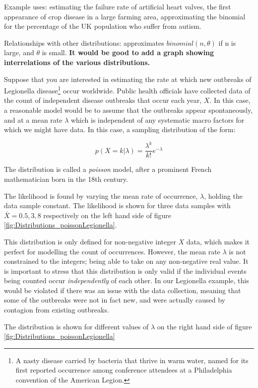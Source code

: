 \documentclass[11pt,fullpage]{book}
\begin{document}
Example uses: estimating the failure rate of artificial heart valves, the first appearance of crop disease in a large farming area, approximating the binomial for the percentage of the UK population who suffer from autism.

Relationships with other distributions: approximates $binomial(n,\theta)$ if n is large, and $\theta$ is small. \textbf{It would be good to add a graph showing interrelations of the various distributions.}

Suppose that you are interested in estimating the rate at which new outbreaks of Legionella disease\footnote{A nasty disease carried by bacteria that thrive in warm water, named for its first reported occurrence among conference attendees at a Philadelphia convention of the American Legion.} occur worldwide. Public health officials have collected data of the count of independent disease outbreaks that occur each year, $X$. In this case, a reasonable model would be to assume that the outbreaks appear spontaneously, and at a mean rate $\lambda$ which is independent of any systematic macro factors for which we might have data. In this case, a sampling distribution of the form:

\begin{equation}
p(X=k|\lambda) = \frac{\lambda^k}{k!} e^{-\lambda}
\end{equation}

The distribution is called a \textit{poisson} model, after a prominent French mathematician born in the 18th century.

The likelihood is found by varying the mean rate of occurrence, $\lambda$, holding the data sample constant. The likelihood is shown for three data samples with $\bar{X}=0.5,3,8$ respectively on the left hand side of figure \ref{fig:Distributions_poissonLegionella}. 

This distribution is only defined for non-negative integer $X$ data, which makes it perfect for modelling the count of occurrences. However, the mean rate $\lambda$ is not constrained to the integers; being able to take on any non-negative real value. It is important to stress that this distribution is only valid if the individual events being counted occur \textit{independently} of each other. In our Legionella example, this would be violated if there was an issue with the data collection, meaning that some of the outbreaks were not in fact new, and were actually caused by contagion from existing outbreaks. 

The distribution is shown for different values of $\lambda$ on the right hand side of figure \ref{fig:Distributions_poissonLegionella}
\end{document}
